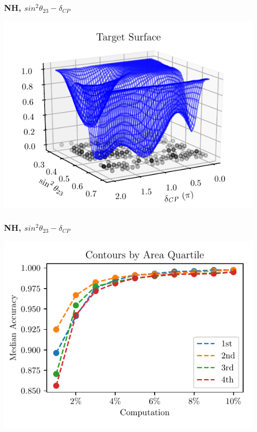 \documentclass[9pt, aspectratio=169]{beamer}
\begin{document}
\begin{frame}
  \frametitle{NH, $sin^{2}\theta_{23}-\delta_{CP}$}
  \centering
  \includegraphics[scale=0.75]{figures_final/target_sdcp.pdf}
\end{frame}

\begin{frame}
  \frametitle{NH, $sin^{2}\theta_{23}-\delta_{CP}$}
  \centering
  \includegraphics[scale=0.75]{figures_final/compare_area_sdcp.pdf}
\end{frame}
\end{document}
